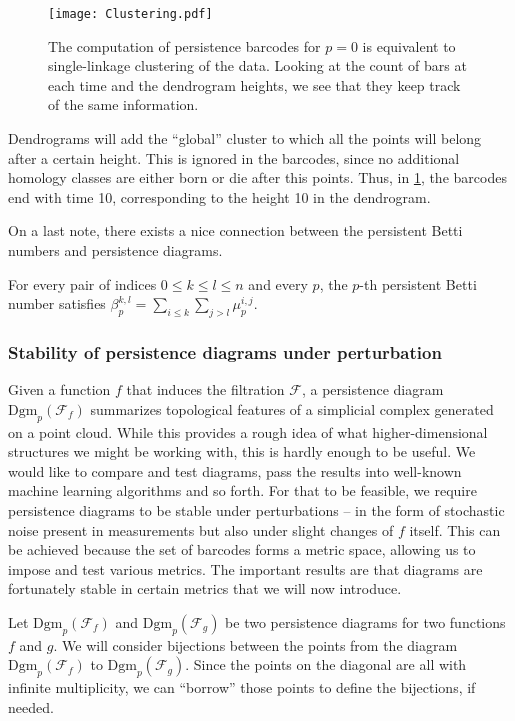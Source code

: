 \begin{figure}[h!]
  \centering
  \texttt{[image: Clustering.pdf]}
  \caption{The computation of persistence barcodes for $p=0$ is equivalent to single-linkage clustering of the data. Looking at the count of bars at each time and the dendrogram heights, we see that they keep track of the same information.}
  \label{fig:clustering}
\end{figure}

Dendrograms will add the ``global'' cluster to which all the points will belong after a certain height. This is ignored in the barcodes, since no additional homology classes are either born or die after this points. Thus, in \ref{fig:clustering}, the barcodes end with time 10, corresponding to the height 10 in the dendrogram.

On a last note, there exists a nice connection between the persistent Betti numbers and persistence diagrams.
\begin{theorem}
  For every pair of indices $0 \leq k \leq l \leq n$ and every $p$, the $p$-th persistent Betti number satisfies $\beta_{p}^{k,l} = \sum_{i \leq k}\sum_{j > l}\mu^{i,j}_{p}$.
\end{theorem}

\subsubsection{Stability of persistence diagrams under perturbation}
Given a function $f$ that induces the filtration $\mathcal{F}$, a persistence diagram $\text{Dgm}_{p}(\mathcal{F}_{f})$ summarizes topological features of a simplicial complex generated on a point cloud. While this provides a rough idea of what higher-dimensional structures we might be working with, this is hardly enough to be useful. We would like to compare and test diagrams, pass the results into well-known machine learning algorithms and so forth. For that to be feasible, we require persistence diagrams to be stable under perturbations -- in the form of stochastic noise present in measurements but also under slight changes of $f$ itself. This can be achieved because the set of barcodes forms a metric space, allowing us to impose and test various metrics. The important results are that diagrams are fortunately stable in certain metrics that we will now introduce.

Let $\text{Dgm}_{p}(\mathcal{F}_{f})$ and $\text{Dgm}_{p}(\mathcal{F}_{g})$ be two persistence diagrams for two functions $f$ and $g$. We will consider bijections between the points from the diagram $\text{Dgm}_{p}(\mathcal{F}_{f})$ to $\text{Dgm}_{p}(\mathcal{F}_{g})$. Since the points on the diagonal are all with infinite multiplicity, we can ``borrow'' those points to define the bijections, if needed.

